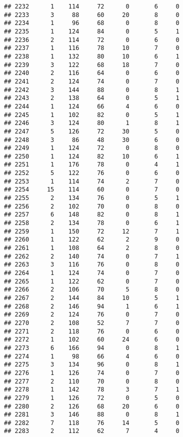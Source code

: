 \documentclass[
]{article}
\begin{document}
\begin{verbatim}
## 2232      1    114     72      0       6     0
## 2233      3     88     60     20       8     0
## 2234      1     96     68      0       8     0
## 2235      1    124     84      0       5     1
## 2236      2    114     72      0       6     0
## 2237      1    116     78     10       7     0
## 2238      1    132     80     10       6     1
## 2239      3    122     68     18       7     0
## 2240      2    116     64      0       6     0
## 2241      2    124     74      0       7     0
## 2242      3    144     88      0       8     1
## 2243      2    138     64      0       5     1
## 2244      1    124     66      4       6     0
## 2245      1    102     82      0       5     1
## 2246      3    124     80      1       8     1
## 2247      5    126     72     30       5     0
## 2248      3     86     48     30       6     0
## 2249      1    124     72      0       8     0
## 2250      1    124     82     10       6     1
## 2251      1    176     78      0       4     1
## 2252      5    122     76      0       6     0
## 2253      1    114     74      2       7     0
## 2254     15    114     60      0       7     0
## 2255      2    134     76      0       5     1
## 2256      2    102     70      0       8     0
## 2257      6    148     82      0       8     1
## 2258      2    134     78      0       6     1
## 2259      1    150     72     12       7     1
## 2260      1    122     62      2       9     0
## 2261      1    108     64      2       8     0
## 2262      2    140     74      0       7     1
## 2263      3    116     76      0       8     0
## 2264      1    124     74      0       7     0
## 2265      1    122     62      0       7     0
## 2266      2    106     70      5       8     0
## 2267      2    144     84     10       5     1
## 2268      2    146     94      1       6     1
## 2269      2    124     76      0       7     0
## 2270      2    108     52      7       7     0
## 2271      2    118     76      0       6     0
## 2272      1    102     60     24       6     0
## 2273      6    166     94      0       8     1
## 2274      1     98     66      4       6     0
## 2275      3    134     96      0       8     1
## 2276      1    126     74      0       7     0
## 2277      2    110     70      0       8     0
## 2278      1    142     78      3       7     1
## 2279      1    126     72      0       5     0
## 2280      2    126     68     20       6     0
## 2281      3    146     88      0       8     1
## 2282      7    118     76     14       5     0
## 2283      2    112     62      7       4     0

\end{verbatim}
\end{document}
